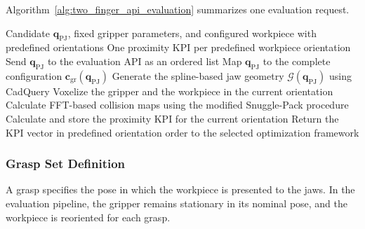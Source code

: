 Algorithm~\ref{alg:two_finger_api_evaluation} summarizes
one evaluation request.

\begin{algorithm}[htbp]
\caption{API evaluation of a two-finger gripper candidate}
\label{alg:two_finger_api_evaluation}
\begin{algorithmic}[1]
\Require Candidate $\mathbf{q}_{\mathrm{PJ}}$, fixed gripper parameters,
         and configured workpiece with predefined orientations
\Ensure One proximity KPI per predefined workpiece orientation
\State Send $\mathbf{q}_{\mathrm{PJ}}$ to the evaluation API as an ordered list
\State Map $\mathbf{q}_{\mathrm{PJ}}$ to the complete configuration
       $\mathbf{c}_{\mathrm{gr}}(\mathbf{q}_{\mathrm{PJ}})$
\State Generate the spline-based jaw geometry
       $\mathcal{G}(\mathbf{q}_{\mathrm{PJ}})$ using CadQuery
    \State Voxelize the gripper and the workpiece in the current orientation
    \State Calculate FFT-based collision maps using the modified
           Snuggle-Pack procedure
    \State Calculate and store the proximity KPI for the current orientation
\EndFor
\State Return the KPI vector in predefined orientation order
       to the selected optimization framework
\end{algorithmic}
\end{algorithm}


\subsubsection{Grasp Set Definition}
\label{sec:grasp_set}

A grasp specifies the pose in which the workpiece is presented to the jaws. In the evaluation
pipeline, the gripper remains stationary in its nominal pose, and the workpiece is reoriented for
each grasp.

